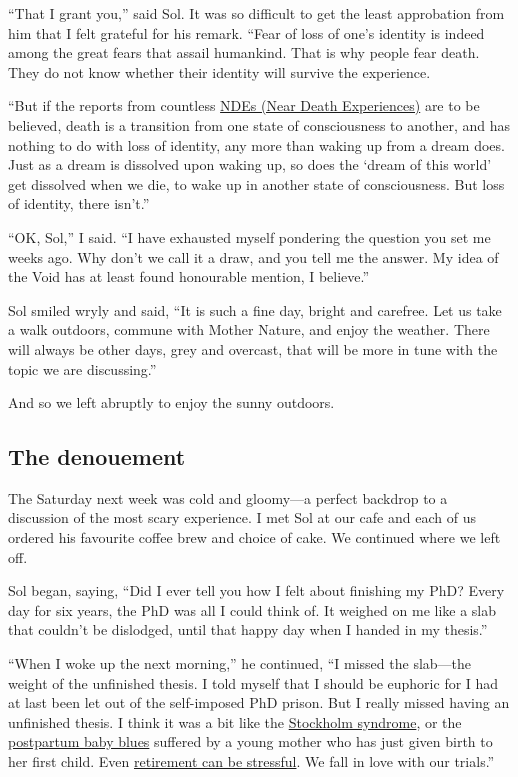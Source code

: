\documentclass[
  a4paper,
]{article}
\begin{document}
``That I grant you,'' said Sol. It was so difficult to get the least
approbation from him that I felt grateful for his remark. ``Fear of loss
of one's identity is indeed among the great fears that assail humankind.
That is why people fear death. They do not know whether their identity
will survive the experience.

``But if the reports from countless
\href{https://en.wikipedia.org/wiki/Near-death_experience}{NDEs (Near
Death Experiences)} are to be believed, death is a transition from one
state of consciousness to another, and has nothing to do with loss of
identity, any more than waking up from a dream does. Just as a dream is
dissolved upon waking up, so does the `dream of this world' get
dissolved when we die, to wake up in another state of consciousness. But
loss of identity, there isn't.''

``OK, Sol,'' I said. ``I have exhausted myself pondering the question
you set me weeks ago. Why don't we call it a draw, and you tell me the
answer. My idea of the Void has at least found honourable mention, I
believe.''

Sol smiled wryly and said, ``It is such a fine day, bright and carefree.
Let us take a walk outdoors, commune with Mother Nature, and enjoy the
weather. There will always be other days, grey and overcast, that will
be more in tune with the topic we are discussing.''

And so we left abruptly to enjoy the sunny outdoors.

\hypertarget{the-denouement}{%
\subsection{The denouement}\label{the-denouement}}

The Saturday next week was cold and gloomy---a perfect backdrop to a
discussion of the most scary experience. I met Sol at our cafe and each
of us ordered his favourite coffee brew and choice of cake. We continued
where we left off.

Sol began, saying, ``Did I ever tell you how I felt about finishing my
PhD? Every day for six years, the PhD was all I could think of. It
weighed on me like a slab that couldn't be dislodged, until that happy
day when I handed in my thesis.''

``When I woke up the next morning,'' he continued, ``I missed the
slab---the weight of the unfinished thesis. I told myself that I should
be euphoric for I had at last been let out of the self-imposed PhD
prison. But I really missed having an unfinished thesis. I think it was
a bit like the
\href{https://en.wikipedia.org/wiki/Stockholm_syndrome}{Stockholm
syndrome}, or the
\href{https://www.mayoclinic.org/diseases-conditions/postpartum-depression/symptoms-causes/syc-20376617}{postpartum
baby blues} suffered by a young mother who has just given birth to her
first child. Even
\href{https://www.health.harvard.edu/mens-health/retirement-stress-taking-it-too-easy-can-be-bad-for-you}{retirement
can be stressful}. We fall in love with our trials.''
\end{document}
